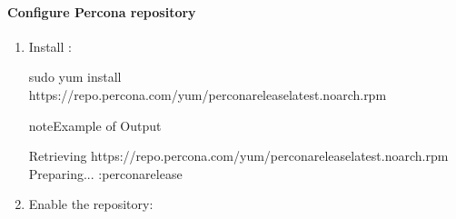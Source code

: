 \documentclass[letterpaper,10pt,english]{sphinxmanual}
\begin{document}
\paragraph{Configure Percona repository}
\label{\detokenize{install/yum:configure-percona-repository}}\begin{enumerate}
%
\item {} 
\sphinxAtStartPar
Install :

\begin{sphinxVerbatim}[commandchars=\\\{\}]
\PYGZdl{} sudo yum install https://repo.percona.com/yum/percona\PYGZhy{}release\PYGZhy{}latest.noarch.rpm
\end{sphinxVerbatim}

\begin{sphinxadmonition}{note}{Example of Output}

\begin{sphinxVerbatim}[commandchars=\\\{\}]
Retrieving https://repo.percona.com/yum/percona\PYGZhy{}release\PYGZhy{}latest.noarch.rpm
Preparing...                
:percona\PYGZhy{}release        
\end{sphinxVerbatim}
\end{sphinxadmonition}

\item {} 
\sphinxAtStartPar
Enable the repository: 

\end{enumerate}
\end{document}
